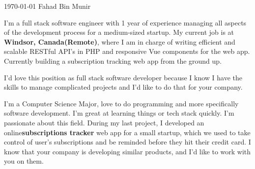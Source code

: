 \documentclass[11pt, a4paper]{awesome-cv}
\begin{document}
\makecvheader[R]

\makecvfooter
  {\today}
  {Fahad Bin Munir}
  {}

\makelettertitle

\begin{cvletter}

I’m a full stack software engineer with 1 year of experience managing all aspects of the development process for a medium-sized startup. My current job is at \textbf{Windsor, Canada(Remote)}, where I am in charge of  writing efficient and scalable RESTful API’s in PHP and responsive Vue components for the web app.
Currently building a subscription tracking web app from the ground up.


I'd love this position as full stack software developer because I know I have the skills to manage complicated projects and I'd like to do that for your company.

I'm a Computer Science Major, love to do programming and more specifically software development. I’m great at learning things or tech stack quickly. I'm passionate about this field. During my last project, I developed an online\textbf{subscriptions tracker} web app for a small startup, which we used to take control of user's subscriptions and be reminded before they hit their credit card. I know that your company is developing similar products, and I'd like to work with you on them.

\end{cvletter}


\makeletterclosing
\end{document}
